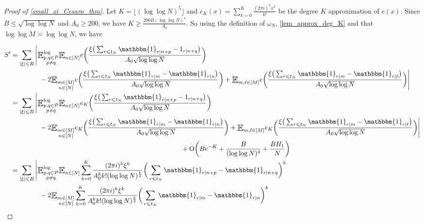 \documentclass[letter,11pt]{article}
\theoremstyle{plain} %
\theoremstyle{definition} %
\theoremstyle{plain}
\theoremstyle{plain}
\theoremstyle{plain}
\numberwithin{equation}{section}
\newcommand{\Oh}{{\mathrm O}}
\renewcommand{\leq}{\leqslant}
\renewcommand{\geq}{\geqslant}
\newcommand{\E}{\raisebox{-0.4ex}{\scalebox{1.4}[1.3]{$\mathbb{E}$}}}
\newcommand{\Esub}[1]{\raisebox{-0.4ex}{\scalebox{1.4}[1.3]{$\mathbb{E}$}}\raisebox{-0.35ex}{\ensuremath{_{\scriptstyle #1}}}}
\newcommand{\logE}{{\E}^{\log}}
\newcommand{\1}{\mathbbm{1}}
\newcommand{\Pc}{\mathcal{P}}
\begin{document}
\begin{proof}[Proof of \cref{small_xi_Cesaro_thm}]
Let
$K = \lfloor(\log\log{N})^5\rfloor$ and
$e_K(x)=\sum_{k=0}^K \frac{(2\pi i)^k x^k}{k!}$
be the degree $K$ approximation of $e(x)$.
Since $B\leq \sqrt{\log\log{N}}$ and $A_0\geq 200$, we have $K\geq \frac{200 B (\log\log{N})^4}{A_0}$. So using the definition of $\omega_N$, \cref{lem_approx_deg_K} and that $\log\log{M}\asymp\log\log{N}$, we have

\begin{align}\label{eqn_S'}
S' &= \sum_{|\xi|\leq B}\Bigg|
\logE_{\substack{p,q\in\Pc \\ p\neq q}} \Esub{n\in[N]}e\bigg(\frac{\xi \big(\sum_{r\leq t_N}\1_{r\mid n+p}-1_{r\mid n+q}\big)}{A_0\sqrt{\log\log{N}}}\bigg) \notag \\
& \hspace*{1.5cm} - 2\Esub{\substack{m\in[M] \\ n\in[N]}}e\bigg(\frac{\xi\big(\sum_{r\leq t_N}\1_{r\mid m}-\1_{r\mid n}\big)}{A_0\sqrt{\log\log{N}}}\bigg) + \Esub{m,\ell\in[M]} e\bigg(\frac{\xi\big(\sum_{r\leq t_N}\1_{r\mid m}-\1_{r\mid \ell}\big)}{A_0\sqrt{\log\log{N}}}\bigg)\Bigg|
\notag \\
&=\sum_{|\xi|\leq B}\Bigg|
\logE_{\substack{p,q\in\Pc \\ p\neq q}} \Esub{n\in[N]}e_K\bigg(\frac{\xi \big(\sum_{r\leq t_N}\1_{r\mid n+p}-1_{r\mid n+q}\big)}{A_0\sqrt{\log\log{N}}}\bigg) \notag \\
& \hspace*{1.5cm} - 2\Esub{\substack{m\in[M] \\ n\in[N]}}e_K\bigg(\frac{\xi\big(\sum_{r\leq t_N}\1_{r\mid m}-\1_{r\mid n}\big)}{A_0\sqrt{\log\log{N}}}\bigg) + \Esub{m,\ell\in[M]} e_K\bigg(\frac{\xi\big(\sum_{r\leq t_N}\1_{r\mid m}-\1_{r\mid \ell}\big)}{A_0\sqrt{\log\log{N}}}\bigg)\Bigg|
\notag \\
&\hspace*{8.9cm} + \Oh\bigg(B e^{-K}+\frac{B}{(\log\log N)^4}+\frac{BH_1}{N}\bigg) \notag \\
&= \sum_{|\xi|\leq B}\Bigg|
\logE_{\substack{p,q\in\Pc \\ p\neq q}} \Esub{n\in[N]}
\sum_{k=0}^K \frac{(2\pi i)^k \xi^k}{A_0^k k!(\log\log N)^{\frac{k}{2}}}
\bigg(\sum_{r\leq t_N}\1_{r\mid n+p}-\1_{r\mid n+q}\bigg)^k
\notag \\
& \hspace*{1.5cm}
-2\Esub{\substack{m\in[M] \\ n\in[N]}}
\sum_{k=0}^K \frac{(2\pi i)^k \xi^k}{A_0^k k!(\log\log N)^{\frac{k}{2}}}\bigg(\sum_{r\leq t_N} \1_{r\mid m}-\1_{r\mid n}\bigg)^k
\notag \\

\end{align}
\end{proof}
\end{document}
